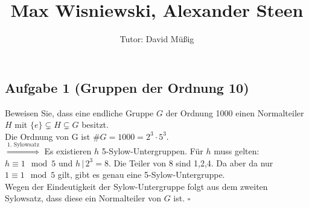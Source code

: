 \documentclass[11pt,a4paper,ngerman]{article}
\author{Tutor: David Müßig}
\date{}
\title{Max Wisniewski, Alexander Steen}
\begin{document}

\maketitle
\thispagestyle{fancy}


\subsection*{Aufgabe 1 \mdseries (Gruppen der Ordnung 10)}
Beweisen Sie, dass eine endliche Gruppe $G$ der Ordnung 1000 einen Normalteiler $H$
mit $\{e\} \subsetneq H \subsetneq G$ besitzt. \\

Die Ordnung von G ist $\#G = 1000 = 2^3 \cdot 5^3$. \\
$\stackrel{\text{1. Sylowsatz}}{\Rightarrow}$ Es existieren $h$ 5-Sylow-Untergruppen.  Für $h$ muss gelten: $h \equiv 1 \mod 5$ und $h \, | \, 2^3 = 8$. Die Teiler von 8 sind 1,2,4. Da aber da nur $1 \equiv 1 \mod 5$ gilt, gibt es genau eine 5-Sylow-Untergruppe. \\
Wegen der Eindeutigkeit der Sylow-Untergruppe folgt aus dem zweiten Sylowsatz, dass diese ein Normalteiler von $G$ ist.
\mbox{} \hfill $\square$


\end{document}
